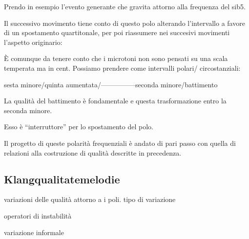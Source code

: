 Prendo in esempio l’evento generante che gravita attorno alla frequenza del sib5.

Il successivo movimento tiene conto di questo polo alterando l’intervallo a favore
di un spostamento quartitonale, per poi riassumere nei succesivi movimenti l’aspetto originario:

È comunque da tenere conto che i microtoni non sono pensati su una scala temperata ma in cent. 
Possiamo prendere come intervalli polari/ circostanziali:

sesta minore/quinta aumentata/—————seconda minore/battimento 

La qualità del battimento è fondamentale e questa trasformazione entro la seconda minore.

Esso è “interruttore” per lo spostamento del polo.

Il progetto di queste polarità frequenziali è andato di pari passo con quella di
relazioni alla costruzione di qualità descritte in precedenza.   

\subsection{Klangqualitatemelodie}

variazioni delle qualità attorno a i poli. tipo di variazione 

operatori di instabilità

variazione informale









  


